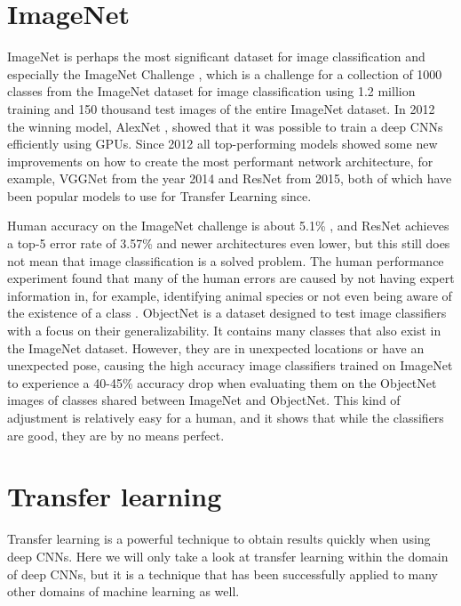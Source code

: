 \section{ImageNet}

ImageNet  \citep{imagenet}  is perhaps the most significant dataset for image classification and especially the ImageNet Challenge \citep{ILSVRC}, which is a challenge for a collection of 1000 classes from the ImageNet dataset for image classification using 1.2 million training and 150 thousand test images of the entire ImageNet dataset. In 2012 the winning model, AlexNet \citep{alexNet}, showed that it was possible to train a deep CNNs efficiently using GPUs. Since 2012 all top-performing models showed some new improvements on how to create the most performant network architecture, for example, VGGNet from the year 2014 and ResNet \citep{resNet} from 2015, both of which have been popular models to use for Transfer Learning since.

Human accuracy on the ImageNet challenge is about 5.1\% \citep{imageNet_summary}, and ResNet achieves a top-5 error rate of 3.57\% \citep{resNet} and newer architectures even lower, but this still does not mean that image classification is a solved problem. The human performance experiment found that many of the human errors are caused by not having expert information in, for example, identifying animal species or not even being aware of the existence of a class \citep{imageNet_summary}. ObjectNet \citep{objectNet} is a dataset designed to test image classifiers with a focus on their generalizability. It contains many classes that also exist in the ImageNet dataset. However, they are in unexpected locations or have an unexpected pose, causing the high accuracy image classifiers trained on ImageNet to experience a 40-45\% accuracy drop when evaluating them on the ObjectNet images of classes shared between ImageNet and ObjectNet. This kind of adjustment is relatively easy for a human, and it shows that while the classifiers are good, they are by no means perfect.

\section{Transfer learning}
Transfer learning is a powerful technique to obtain results quickly when using deep CNNs. Here we will only take a look at transfer learning within the domain of deep CNNs, but it is a technique that has been successfully applied to many other domains of machine learning as well.

